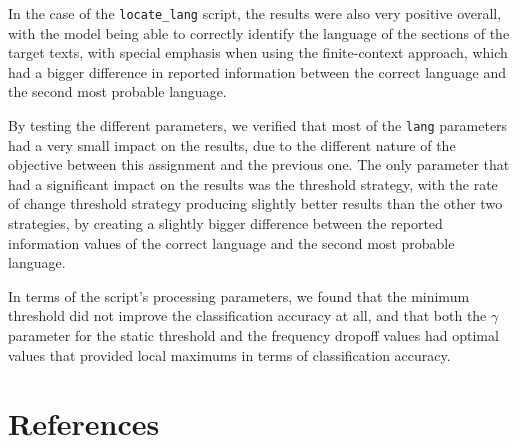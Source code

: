 \documentclass{article}
\begin{document}
In the case of the \texttt{locate\_lang} script, the results were also very positive overall, with the model being able to correctly identify the language of the sections of the target texts,
with special emphasis when using the finite-context approach, which had a bigger difference in reported information between the correct language and the second most probable language.

By testing the different parameters, we verified that most of the \texttt{lang} parameters had a very small impact on the results, due to the different nature of the objective between this
assignment and the previous one. The only parameter that had a significant impact on the results was the threshold strategy, with the rate of change threshold strategy producing
slightly better results than the other two strategies, by creating a slightly bigger difference between the reported information values of the correct language and the second most probable language.

In terms of the script's processing parameters, we found that the minimum threshold did not improve the classification accuracy at all, and that both the $\gamma$ parameter for the static threshold and the frequency dropoff values had optimal values that provided local maximums in terms of classification accuracy.

\section{References}


\end{document}
